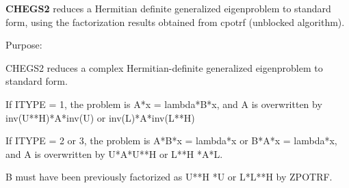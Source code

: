 {\bfseries C\+H\+E\+G\+S2} reduces a Hermitian definite generalized eigenproblem to standard form, using the factorization results obtained from cpotrf (unblocked algorithm). 

 \begin{DoxyParagraph}{Purpose\+: }
\begin{DoxyVerb} CHEGS2 reduces a complex Hermitian-definite generalized
 eigenproblem to standard form.

 If ITYPE = 1, the problem is A*x = lambda*B*x,
 and A is overwritten by inv(U**H)*A*inv(U) or inv(L)*A*inv(L**H)

 If ITYPE = 2 or 3, the problem is A*B*x = lambda*x or
 B*A*x = lambda*x, and A is overwritten by U*A*U**H or L**H *A*L.

 B must have been previously factorized as U**H *U or L*L**H by ZPOTRF.\end{DoxyVerb}
 
\end{DoxyParagraph}

